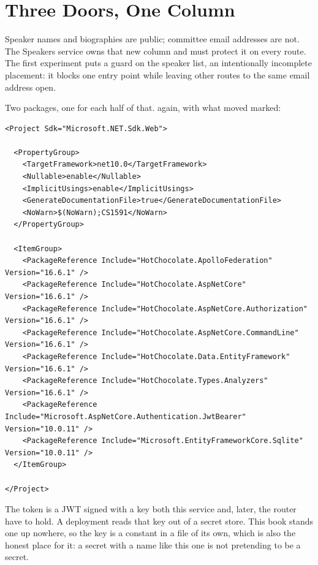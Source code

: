 \section{Three Doors, One Column}
\label{sec:ch12-three-doors-one-column}

%
Speaker names and biographies are public; committee email addresses are not.
The Speakers service owns that new column and must protect it on every route.
The first experiment puts a guard on the speaker list, an intentionally
incomplete placement: it blocks one entry point while leaving other routes
to the same email address open.

%
Two packages, one for each half of that.  again, with
what moved marked:

\begin{verbatim}
<Project Sdk="Microsoft.NET.Sdk.Web">

  <PropertyGroup>
    <TargetFramework>net10.0</TargetFramework>
    <Nullable>enable</Nullable>
    <ImplicitUsings>enable</ImplicitUsings>
    <GenerateDocumentationFile>true</GenerateDocumentationFile>
    <NoWarn>$(NoWarn);CS1591</NoWarn>
  </PropertyGroup>

  <ItemGroup>
    <PackageReference Include="HotChocolate.ApolloFederation" Version="16.6.1" />
    <PackageReference Include="HotChocolate.AspNetCore" Version="16.6.1" />
    <PackageReference Include="HotChocolate.AspNetCore.Authorization" Version="16.6.1" />
    <PackageReference Include="HotChocolate.AspNetCore.CommandLine" Version="16.6.1" />
    <PackageReference Include="HotChocolate.Data.EntityFramework" Version="16.6.1" />
    <PackageReference Include="HotChocolate.Types.Analyzers" Version="16.6.1" />
    <PackageReference Include="Microsoft.AspNetCore.Authentication.JwtBearer" Version="10.0.11" />
    <PackageReference Include="Microsoft.EntityFrameworkCore.Sqlite" Version="10.0.11" />
  </ItemGroup>

</Project>
\end{verbatim}

%
The token is a JWT signed with a key both this service and, later, the router
have to hold. A deployment reads that key out of a secret store. This book
stands one up nowhere, so the key is a constant in a file of its own, which
is also the honest place for it: a secret with a name like this one is not
pretending to be a secret.


